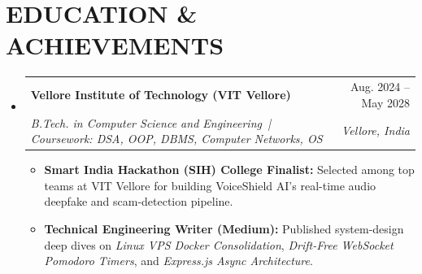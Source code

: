 \documentclass[letterpaper,10.5pt]{article}
\makeatletter
\newcommand{\resumeItem}[1]{
  \item\small{
    {#1 \vspace{-1.5pt}}
  }
}
\newcommand{\resumeSubheading}[4]{
  \vspace{-1pt}\item
    \begin{tabular*}{\textwidth}[t]{l@{\extracolsep{\fill}}r}
      #1 & {\color{dark-grey}\small #2}\vspace{0.5pt}\\
      \textit{\small #3} & {\color{dark-grey}\small\textit{#4}}\\
    \end{tabular*}\vspace{-3.5pt}
}
\newcommand{\resumeSubHeadingListStart}{\begin{itemize}[leftmargin=0in, label={}, topsep=0pt, itemsep=1.5pt, parsep=0pt, partopsep=0pt]}
\newcommand{\resumeSubHeadingListEnd}{\end{itemize}\vspace{-2pt}}
\newcommand{\resumeItemListStart}{\begin{itemize}[leftmargin=0.16in, topsep=1pt, itemsep=0.8pt, parsep=0pt, partopsep=0pt]}
\newcommand{\resumeItemListEnd}{\end{itemize}\vspace{-2pt}}
\makeatother
\begin{document}
\section{EDUCATION \& ACHIEVEMENTS}
\resumeSubHeadingListStart
  \resumeSubheading
    {\textbf{Vellore Institute of Technology (VIT Vellore)}}{Aug. 2024 -- May 2028}
    {B.Tech. in Computer Science and Engineering \,|\, Coursework: DSA, OOP, DBMS, Computer Networks, OS}{Vellore, India}
    \resumeItemListStart
      \resumeItem{\textbf{Smart India Hackathon (SIH) College Finalist:} Selected among top teams at VIT Vellore for building VoiceShield AI's real-time audio deepfake and scam-detection pipeline.}
      \resumeItem{\textbf{Technical Engineering Writer (Medium):} Published system-design deep dives on \emph{Linux VPS Docker Consolidation}, \emph{Drift-Free WebSocket Pomodoro Timers}, and \emph{Express.js Async Architecture}.}
    \resumeItemListEnd
\resumeSubHeadingListEnd

\end{document}
